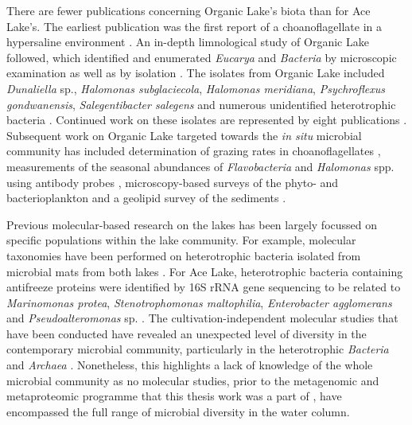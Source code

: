 There are fewer publications concerning Organic Lake's biota than for Ace Lake's.
The earliest publication was the first report of a choanoflagellate in a hypersaline environment \cite{vandenHoff1986}.
An in-depth limnological study of Organic Lake followed, which identified and enumerated \emph{Eucarya} and \emph{Bacteria} by microscopic examination as well as by isolation \cite{Franzmann1987b}.
The isolates from Organic Lake included \emph{Dunaliella} sp., \emph{Halomonas subglaciecola}, \emph{Halomonas meridiana}, \emph{Psychroflexus gondwanensis}, \emph{Salegentibacter salegens} and numerous unidentified heterotrophic bacteria \cite{Franzmann1987b}.
Continued work on these isolates are represented by eight publications \cite{Burch1983, Franzmann1987a, McMeekin1988b, James1990, Dobson1991, Dobson1993, Bowman1998, McCammon2000}.
Subsequent work on Organic Lake targeted towards the \emph{in situ} microbial community has included determination of grazing rates in choanoflagellates \cite{Marchant1993}, measurements of the seasonal abundances of \emph{Flavobacteria} and \emph{Halomonas} spp. using antibody probes \cite{James1994},  microscopy-based surveys of the phyto- and bacterioplankton \cite{Roberts1996, Perriss1997} and a geolipid survey of the sediments \cite{Rogerson1996}.

Previous molecular-based research on the lakes has been largely focussed on specific populations within the lake community.
For example, molecular taxonomies have been performed on heterotrophic bacteria isolated from microbial mats from both lakes \cite{VanTrappen2002}.
For Ace Lake, heterotrophic bacteria containing antifreeze proteins were identified by 16S \ac{rRNA} gene sequencing to be related to \emph{Marinomonas protea}, \emph{Stenotrophomonas maltophilia}, \emph{Enterobacter agglomerans} and \emph{Pseudoalteromonas} sp. \cite{Gilbert2004}.
The cultivation-independent molecular studies that have been conducted have revealed an unexpected level of diversity in the contemporary microbial community, particularly in the heterotrophic \emph{Bacteria} and \emph{Archaea} \cite{Bowman2000a, Bowman2000b, Coolen2004b, Coolen2006, Coolen2008}.
Nonetheless, this highlights a lack of knowledge of the whole microbial community as no molecular studies, prior to the metagenomic and metaproteomic programme that this thesis work was a part of \cite{Ng2010a, Lauro2011}, have encompassed the full range of microbial diversity in the water column.

